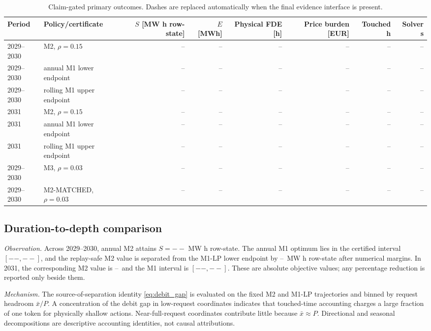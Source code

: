 \documentclass[10pt,journal]{IEEEtran}
\newif\ifFinalResultsReady
\providecommand{\HeldMTwoS}{--}
\providecommand{\HeldMOneLower}{--}
\providecommand{\HeldMOneUpper}{--}
\providecommand{\HeldCertMargin}{--}
\providecommand{\ConfirmMTwoS}{--}
\providecommand{\ConfirmMOneLower}{--}
\providecommand{\ConfirmMOneUpper}{--}
\providecommand{\HeldMTwoE}{--}
\providecommand{\HeldMThreeS}{--}
\providecommand{\HeldMMatchedS}{--}
\providecommand{\HeldMThreeFDE}{--}
\providecommand{\HeldMMatchedFDE}{--}
\providecommand{\HeldMThreeBurden}{--}
\providecommand{\HeldMMatchedBurden}{--}
\begin{document}
\begin{table}[t]
\caption{Claim-gated primary outcomes. Dashes are replaced automatically when the final evidence interface is present.}
\label{tab:main_results}
\centering
\footnotesize
\begin{tabular}{@{}llrrrrrr@{}}
\toprule
Period & Policy/certificate & $S$ [MW h row-state] & $E$ [MWh] & Physical FDE [h] & Price burden [EUR] & Touched h & Solver s \\
\midrule
2029--2030 & M2, $\rho=0.15$ & \HeldMTwoS & \HeldMTwoE & -- & -- & -- & -- \\
2029--2030 & annual M1 lower endpoint & \HeldMOneLower & -- & -- & -- & -- & -- \\
2029--2030 & rolling M1 upper endpoint & \HeldMOneUpper & -- & -- & -- & -- & -- \\
2031 & M2, $\rho=0.15$ & \ConfirmMTwoS & -- & -- & -- & -- & -- \\
2031 & annual M1 lower endpoint & \ConfirmMOneLower & -- & -- & -- & -- & -- \\
2031 & rolling M1 upper endpoint & \ConfirmMOneUpper & -- & -- & -- & -- & -- \\
2029--2030 & M3, $\rho=0.03$ & \HeldMThreeS & -- & \HeldMThreeFDE & \HeldMThreeBurden & -- & -- \\
2029--2030 & M2-MATCHED, $\rho=0.03$ & \HeldMMatchedS & -- & \HeldMMatchedFDE & \HeldMMatchedBurden & -- & -- \\
\bottomrule
\end{tabular}
\end{table}

\subsection{Duration-to-depth comparison}

\ifFinalResultsReady
\emph{Observation.} Across 2029--2030, annual M2 attains $S=\HeldMTwoS$ MW h row-state. The annual M1 optimum lies in the certified interval $[\HeldMOneLower,\HeldMOneUpper]$, and the replay-safe M2 value is separated from the M1-LP lower endpoint by \HeldCertMargin\ MW h row-state after numerical margins. In 2031, the corresponding M2 value is \ConfirmMTwoS\ and the M1 interval is $[\ConfirmMOneLower,\ConfirmMOneUpper]$. These are absolute objective values; any percentage reduction is reported only beside them.

\emph{Mechanism.} The source-of-separation identity \eqref{eq:debit_gap} is evaluated on the fixed M2 and M1-LP trajectories and binned by request headroom $\bar x/P$. A concentration of the debit gap in low-request coordinates indicates that touched-time accounting charges a large fraction of one token for physically shallow actions. Near-full-request coordinates contribute little because $\bar x\approx P$. Directional and seasonal decompositions are descriptive accounting identities, not causal attributions.
\end{document}
